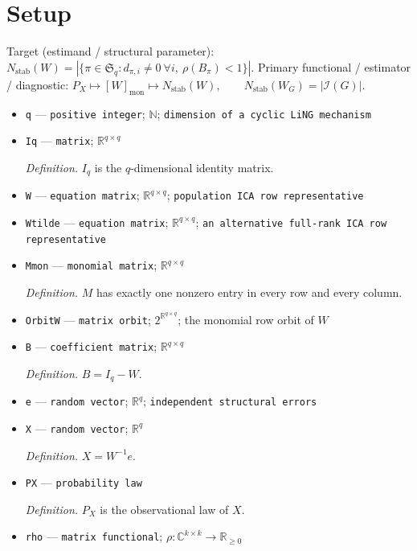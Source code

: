 \documentclass{article}
\begin{document}
\section{Setup}

Target (estimand / structural parameter): \(N_{\mathrm{stab}}(W)=|\{\pi\in\mathfrak S_q:d_{\pi,i}\neq0\ \forall i,\ \rho(B_\pi)<1\}|\).
Primary functional / estimator / diagnostic: \(P_X\mapsto[W]_{\mathrm{mon}}\mapsto N_{\mathrm{stab}}(W),\qquad N_{\mathrm{stab}}(W_G)=|\mathcal I(G)|\).
\begin{itemize}
  \item \texttt{q} --- \texttt{positive integer}; \(\mathbb N\); \texttt{dimension of a cyclic LiNG mechanism}
  \item \texttt{Iq} --- \texttt{matrix}; \(\mathbb R^{q\times q}\)
  \par\smallskip\noindent\emph{Definition.} \(I_q\) is the \(q\)-dimensional identity matrix.
  \item \texttt{W} --- \texttt{equation matrix}; \(\mathbb R^{q\times q}\); \texttt{population ICA row representative}
  \item \texttt{Wtilde} --- \texttt{equation matrix}; \(\mathbb R^{q\times q}\); \texttt{an alternative full-\allowbreak{}rank ICA row representative}
  \item \texttt{Mmon} --- \texttt{monomial matrix}; \(\mathbb R^{q\times q}\)
  \par\smallskip\noindent\emph{Definition.} \(M\) has exactly one nonzero entry in every row and every column.
  \item \texttt{OrbitW} --- \texttt{matrix orbit}; \(2^{\mathbb R^{q\times q}}\); the monomial row orbit of \(W\)
  \item \texttt{B} --- \texttt{coefficient matrix}; \(\mathbb R^{q\times q}\)
  \par\smallskip\noindent\emph{Definition.} \(B=I_q-W\).
  \item \texttt{e} --- \texttt{random vector}; \(\mathbb R^q\); \texttt{independent structural errors}
  \item \texttt{X} --- \texttt{random vector}; \(\mathbb R^q\)
  \par\smallskip\noindent\emph{Definition.} \(X=W^{-1}e\).
  \item \texttt{PX} --- \texttt{probability law}
  \par\smallskip\noindent\emph{Definition.} \(P_X\) is the observational law of \(X\).
  \item \texttt{rho} --- \texttt{matrix functional}; \(\rho:\mathbb C^{k\times k}\to\mathbb R_{\geq0}\)

\end{itemize}
\end{document}
